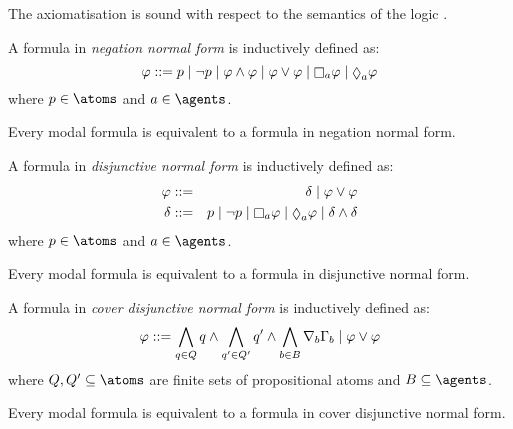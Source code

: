 \begin{lemma}
The axiomatisation \axiomRmlK{} is sound with respect to the semantics of the logic \logicRmlK{}.
\end{lemma}


\begin{definition}
A formula in {\em negation normal form} is inductively defined as:
$$
\phi ::= \atomP \mid
         \neg \atomP \mid
         \phi \land \phi \mid
         \phi \lor \phi \mid
         \necessaryA \phi \mid
         \possibleA \phi
$$
where $\atomP \in \atoms$ and $\agentA \in \agents$.
\end{definition}

\begin{lemma}
Every modal formula is equivalent to a formula in negation normal form.
\end{lemma}


\begin{definition}
A formula in {\em disjunctive normal form} is inductively defined as:
\begin{eqnarray*}
\phi &::=& \delta \mid \phi \lor \phi\\
\delta &::=& \atomP \mid \neg \atomP \mid \necessaryA \phi \mid \possibleA \phi \mid \delta \land \delta
\end{eqnarray*}
where $\atomP \in \atoms$ and $\agentA \in \agents$.
\end{definition}

\begin{lemma}
Every modal formula is equivalent to a formula in disjunctive normal form.
\end{lemma}


\begin{definition}
A formula in {\em cover disjunctive normal form} is inductively defined as:
$$
\varphi ::= \bigwedge_{q \in Q} q \land \bigwedge_{q' \in Q'} q' \land \bigwedge_{b \in B} \nabla_{b} \Gamma_b \mid \varphi \lor \varphi
$$
where $\atomsQ, \atomsQ' \subseteq \atoms$ are finite sets of propositional atoms and $\agentsB \subseteq \agents$.
\end{definition}

\begin{lemma}
Every modal formula is equivalent to a formula in cover disjunctive normal form.
\end{lemma}

